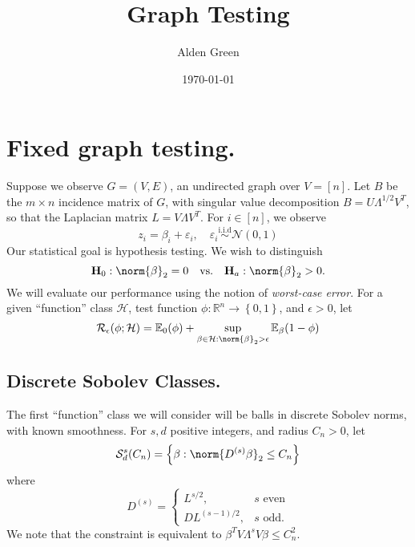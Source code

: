 \documentclass{article}
\newcommand{\Reals}{\mathbb{R}}
\newcommand{\set}[1]{\left\{#1\right\}}
\newcommand{\1}{\mathbf{1}}
\newcommand{\Ebb}{\mathbb{E}}
\theoremstyle{alden}
\theoremstyle{aldenthm}
\theoremstyle{definition}
\theoremstyle{remark}
\begin{document}
\title{Graph Testing}
\author{Alden Green}
\date{\today}
\maketitle

\section{Fixed graph testing.}
\label{sec:fixed_graph_testing}

Suppose we observe $G = (V,E)$, an undirected graph over $V = [n]$. Let $B$ be the $m \times n$ incidence matrix of $G$, with singular value decomposition $B = U\Lambda^{1/2}V^T$, so that the Laplacian matrix $L = V \Lambda V^T$. For $i \in [n]$, we observe
\begin{equation*}
z_i = \beta_i + \varepsilon_i, \quad \varepsilon_i \overset{\textrm{i.i.d}}{\sim} \mathcal{N}(0,1)
\end{equation*}
Our statistical goal is hypothesis testing. We wish to distinguish
\begin{equation*}
\mathbf{H}_0: \norm{\beta}_2 = 0 \quad \textrm{vs.} \quad \mathbf{H}_a: \norm{\beta}_2 > 0.
\end{equation*}
We will evaluate our performance using the notion of \emph{worst-case error}. For a given ``function'' class $\mathcal{H}$, test function $\phi: \Reals^n \to \set{0,1}$, and $\epsilon > 0$, let
\begin{equation*}
\mathcal{R}_{\epsilon}(\phi;\mathcal{H})= \Ebb_{0}(\phi) + \sup_{\beta \in \mathcal{H}:\norm{\beta}_2 > \epsilon} \Ebb_{\beta}(1 - \phi)
\end{equation*}

\subsection{Discrete Sobolev Classes.}

The first ``function'' class we will consider will be balls in discrete Sobolev norms, with known smoothness. For $s,d$ positive integers, and radius $C_n > 0$, let
\begin{equation*}
\mathcal{S}^{s}_{d}(C_n) = \set{\beta: \norm{D^{(s)}\beta}_2 \leq C_n}
\end{equation*}
where
\begin{equation*}
D^{(s)} = 
\begin{cases}
L^{s/2}, & \text{$s$ even} \\
DL^{(s-1)/2}, & \text{$s$ odd}.
\end{cases}
\end{equation*}
We note that the constraint is equivalent to $\beta^T V \Lambda^s V \beta \leq C_n^2$.
\end{document}
